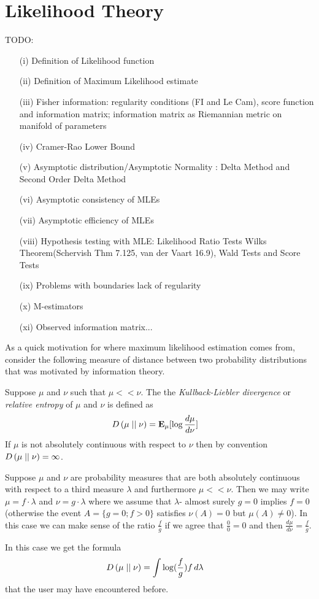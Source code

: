 \section{Likelihood Theory}
TODO:
\begin{itemize}
\item[(i)] Definition of Likelihood function
\item[(ii)] Definition of Maximum Likelihood estimate
\item[(iii)] Fisher information: regularity conditions (FI and Le Cam), score function
  and information matrix; information matrix as Riemannian metric on
  manifold of parameters
\item[(iv)] Cramer-Rao Lower Bound
\item[(v)] Asymptotic distribution/Asymptotic Normality : Delta Method and Second Order Delta Method
\item[(vi)] Asymptotic consistency of MLEs 
\item[(vii)] Asymptotic efficiency of MLEs
\item[(viii)] Hypothesis testing with MLE: Likelihood Ratio Tests 
  Wilks Theorem(Schervish Thm 7.125, van der Vaart 16.9), Wald Tests and Score Tests
\item[(ix)] Problems with boundaries lack of regularity
\item[(x)] M-estimators
\item[(xi)]Observed information matrix...
\end{itemize}

As a quick motivation for where maximum likelihood estimation comes
from, consider the following measure of distance between two
probability distributions that was motivated by information theory.
\begin{defn}Suppose $\mu$ and $\nu$ such that $\mu << \nu$.  The the \emph{Kullback-Liebler divergence} or \emph{relative
    entropy} of $\mu$ and $\nu$ is defined as
\begin{align*}
D\left( \mu \mid\mid \nu \right) &= \textbf{E}_{\mu}[\log \frac{d\mu}{d\nu}]
\end{align*}
If $\mu$ is not absolutely continuous with respect to $\nu$ then by
convention $D\left( \mu \mid\mid \nu \right) = \infty$.
\end{defn}

\begin{examp}
Suppose $\mu$ and $\nu$ are probability measures that are both
absolutely continuous with respect to a third measure $\lambda$ and
furthermore $\mu << \nu$.  Then we may write $\mu = f \cdot \lambda$
and $\nu = g \cdot \lambda$ where we assume that $\lambda$- almost
surely $g=0$ implies $f=0$ (otherwise the event $A=\lbrace g=0; f>0 \rbrace$
satisfies $\nu(A)=0$ but $\mu(A)\neq 0$).  In this case we can make sense of the
ratio $\frac{f}{g}$ if we agree that $\frac{0}{0} = 0$ and then $\frac{d\mu}{d\nu} = \frac{f}{g}$.

In this case we get the formula 
\begin{align*}
D\left( \mu \mid\mid \nu \right) &= \int \log(\frac{f}{g}) f \, d\lambda
\end{align*}
that the user may have encountered before.
\end{examp}

